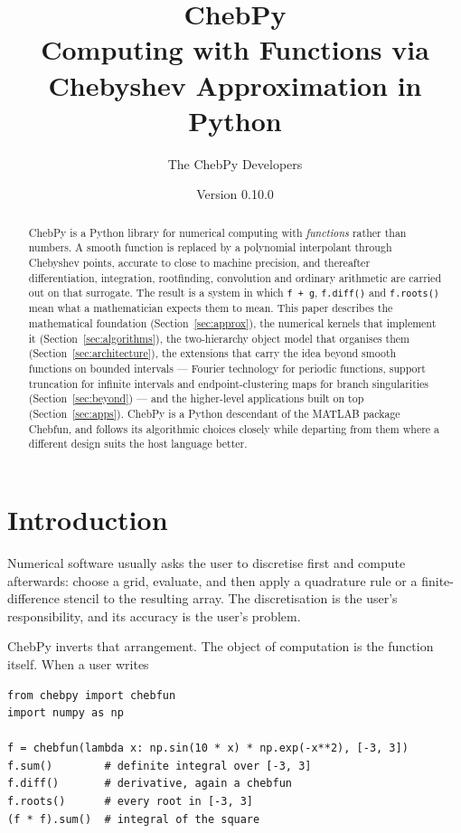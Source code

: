 \documentclass[11pt,a4paper]{article}
\title{\textbf{ChebPy}\\[0.35em]
       \large Computing with Functions via Chebyshev Approximation in Python}
\author{The ChebPy Developers}
\date{Version 0.10.0}
\newcommand{\code}[1]{\texttt{#1}}
\begin{document}
\maketitle

\begin{abstract}
\noindent
ChebPy is a Python library for numerical computing with \emph{functions} rather
than numbers. A smooth function is replaced by a polynomial interpolant through
Chebyshev points, accurate to close to machine precision, and thereafter
differentiation, integration, rootfinding, convolution and ordinary arithmetic
are carried out on that surrogate. The result is a system in which
\code{f + g}, \code{f.diff()} and \code{f.roots()} mean what a mathematician
expects them to mean. This paper describes the mathematical foundation
(Section~\ref{sec:approx}), the numerical kernels that implement it
(Section~\ref{sec:algorithms}), the two-hierarchy object model that organises
them (Section~\ref{sec:architecture}), the extensions that carry the idea
beyond smooth functions on bounded intervals --- Fourier technology for
periodic functions, support truncation for infinite intervals and
endpoint-clustering maps for branch singularities (Section~\ref{sec:beyond})
--- and the higher-level applications built on top (Section~\ref{sec:apps}).
ChebPy is a Python descendant of the MATLAB package Chebfun, and follows its
algorithmic choices closely while departing from them where a different design
suits the host language better.
\end{abstract}

\tableofcontents
\bigskip

\section{Introduction}
\label{sec:intro}

Numerical software usually asks the user to discretise first and compute
afterwards: choose a grid, evaluate, and then apply a quadrature rule or a
finite-difference stencil to the resulting array. The discretisation is the
user's responsibility, and its accuracy is the user's problem.

ChebPy inverts that arrangement. The object of computation is the function
itself. When a user writes

\begin{lstlisting}
from chebpy import chebfun
import numpy as np

f = chebfun(lambda x: np.sin(10 * x) * np.exp(-x**2), [-3, 3])
f.sum()        # definite integral over [-3, 3]
f.diff()       # derivative, again a chebfun
f.roots()      # every root in [-3, 3]
(f * f).sum()  # integral of the square
\end{lstlisting}
\end{document}
